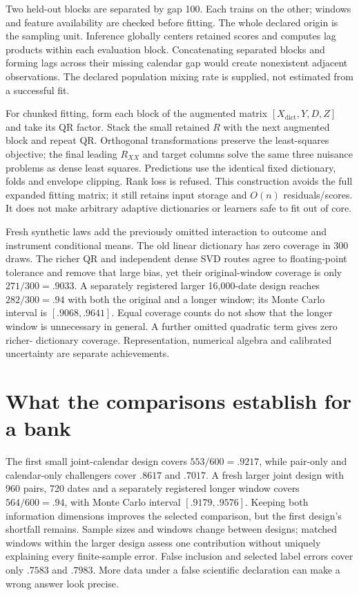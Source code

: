 Two held-out blocks are separated by gap 100. Each trains on the other; windows
and feature availability are checked before fitting. The whole declared origin
is the sampling unit. Inference globally centers retained scores and computes
lag products within each evaluation block. Concatenating separated blocks and
forming lags across their missing calendar gap would create nonexistent adjacent
observations. The declared population mixing rate is supplied, not estimated
from a successful fit.

For chunked fitting, form each block of the augmented matrix
$[X_{\mathrm{dict}},Y,D,Z]$ and take its QR factor. Stack the small retained
$R$ with the next augmented block and repeat QR. Orthogonal transformations
preserve the least-squares objective; the final leading $R_{XX}$ and target
columns solve the same three nuisance problems as dense least squares.
Predictions use the identical fixed dictionary, folds and envelope clipping.
Rank loss is refused. This construction avoids the full expanded fitting
matrix; it still retains input storage and $O(n)$ residuals/scores. It does not
make arbitrary adaptive dictionaries or learners safe to fit out of core.

Fresh synthetic laws add the previously omitted interaction to outcome and
instrument conditional means. The old linear dictionary has zero coverage in
300 draws. The richer QR and independent dense SVD routes agree to floating-point
tolerance and remove that large bias, yet their original-window coverage is
only $271/300=.9033$. A separately registered larger 16,000-date design reaches
$282/300=.94$ with both the original and a longer window; its Monte Carlo interval
is $[.9068,.9641]$. Equal coverage counts do not show that the longer window is
unnecessary in general. A further omitted quadratic term gives zero richer-
dictionary coverage. Representation, numerical algebra and calibrated
uncertainty are separate achievements.

\section{What the comparisons establish for a bank}
\label{r8:comparisons}



The first small joint-calendar design covers $553/600=.9217$, while pair-only
and calendar-only challengers cover $.8617$ and $.7017$. A fresh larger joint
design with 960 pairs, 720 dates and a separately registered longer window
covers $564/600=.94$, with Monte Carlo interval $[.9179,.9576]$. Keeping both
information dimensions improves the selected comparison, but the first design's
shortfall remains. Sample sizes and windows change between designs; matched
windows within the larger design assess one contribution without uniquely
explaining every finite-sample error. False inclusion and selected label errors
cover only $.7583$ and $.7983$. More data under a false scientific declaration
can make a wrong answer look precise.

